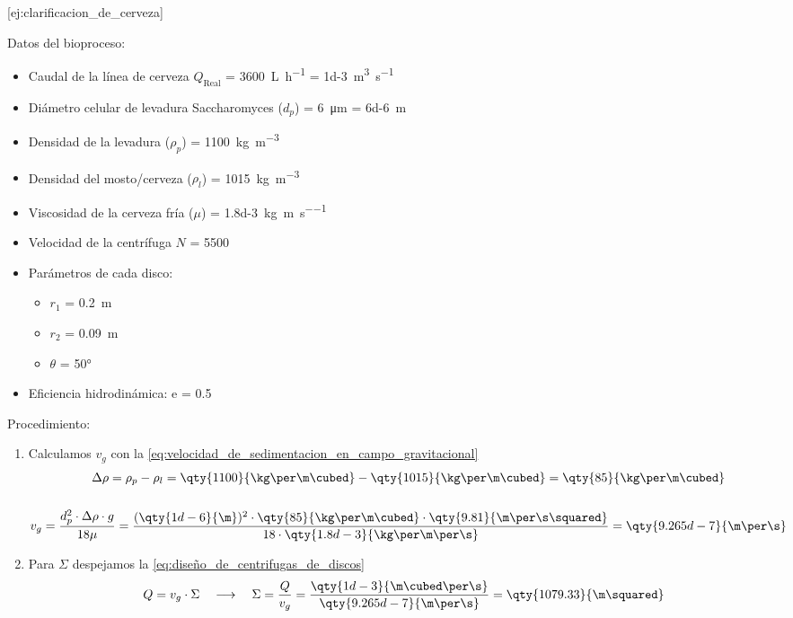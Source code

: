 [ej:clarificacion_de_cerveza]{
    Datos del bioproceso:
    \begin{itemize}
        \item Caudal de la línea de cerveza $Q_{\text{Real}}$ = \qty{3600}{\L\per\hour} = \qty{1d-3}{\m\cubed\per\s}
        \item Diámetro celular de levadura Saccharomyces ($d_{p}$) = \qty{6}{\micro\m} = \qty{6d-6}{\m}
        \item Densidad de la levadura ($\rho_{p}$) = \qty{1100}{\kg\per\m\cubed}
        \item Densidad del mosto/cerveza ($\rho_{l}$) = \qty{1015}{\kg\per\m\cubed}
        \item Viscosidad de la cerveza fría ($\mu$) = \qty{1.8d-3}{\kg\per\m\per\s}
        \item Velocidad de la centrífuga $N$ = \qty{5500}{\rpm}
        \item Parámetros de cada disco:
        \begin{itemize}
	        \item $r_{1}$ = \qty{0.2}{\m}
	        \item $r_{2}$ = \qty{0.09}{\m}
	        \item $\theta$ = 50°
        \end{itemize}
        \item Eficiencia hidrodinámica: e = 0.5
    \end{itemize}
    Procedimiento:
    \begin{enumerate}
        \item Calculamos $v_{g}$ con la \ref{eq:velocidad_de_sedimentacion_en_campo_gravitacional} \begin{gather*}
            \Delta\rho = \rho_{p} - \rho_{l} = \qty{1100}{\kg\per\m\cubed} - \qty{1015}{\kg\per\m\cubed} = \qty{85}{\kg\per\m\cubed}
            \\\\
            v_{g} = \frac{d_{p}^{2}\cdot\Delta\rho\cdot g}{18\mu} = \frac{(\qty{1d-6}{\m})^{2}\cdot\qty{85}{\kg\per\m\cubed}\cdot\qty{9.81}{\m\per\s\squared}}{18\cdot\qty{1.8d-3}{\kg\per\m\per\s}} = \qty{9.265d-7}{\m\per\s}
            \end{gather*}
        \item Para $\Sigma$ despejamos la \autoref{eq:diseño_de_centrifugas_de_discos} \begin{gather*}
            Q = v_{g} \cdot \Sigma \quad\longrightarrow\quad \Sigma = \frac{Q}{v_{g}} = \frac{\qty{1d-3}{\m\cubed\per\s}}{\qty{9.265d-7}{\m\per\s}} = \qty{1079.33}{\m\squared}

\end{gather*}
\end{enumerate}}
